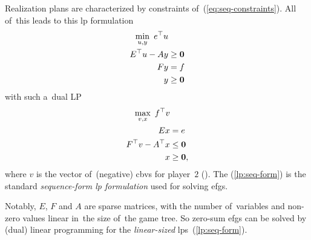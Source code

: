 Realization plans are characterized by constraints of~(\ref{eq:seq-constraints}).
All of~this leads to this \acrshort{lp} formulation
\begin{equation}
  \label{lp:seq-dual}
  \begin{split}
    \min_{u, y}\  e^\top u &\\
    E^\top u - Ay &\ge \boldsymbol{0} \\
    Fy &= f \\
    y &\ge \boldsymbol{0}
  \end{split}
\end{equation}
with such a~dual LP
\begin{equation}
  \label{lp:seq-form}
  \begin{split}
    \max_{v, x}\  f^\top v & \\
    Ex &= e \\
    F^\top v - A^\top x &\le \boldsymbol{0} \\
    x &\ge \boldsymbol{0},
  \end{split}
\end{equation}
where $v$ is the vector of~(negative) \acrshort{cbv}s for player~$2$ (\cite{Cermak2014practical, AGT07}).
The (\ref{lp:seq-form}) is the standard \emph{sequence-form \acrshort{lp} formulation} used for solving \acrshort{efg}s.

Notably, $E$, $F$ and $A$ are sparse matrices, with the number of~variables and non-zero values linear in~the size of~the game tree.
So zero-sum \acrshort{efg}s can be solved by (dual) linear programming for the \emph{linear-sized} \acrshort{lp}s~(\ref{lp:seq-form}).

